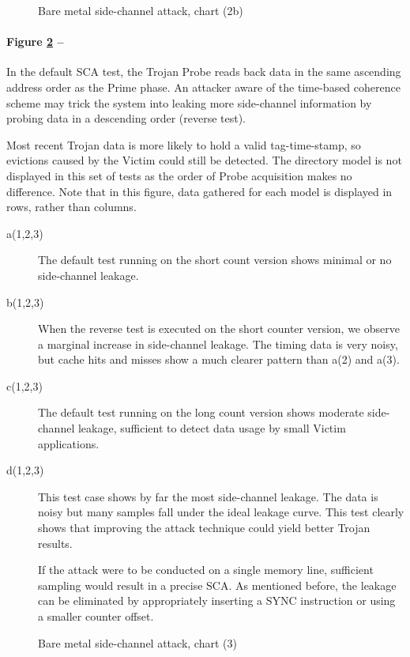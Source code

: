 					\begin{figure}[!h]
					\centering 
						\caption{Bare metal side-channel attack, chart (2b)} 
						\label{baremetal_core_pin_long_2x}
					\end{figure}


\clearpage
				\paragraph{Figure \ref{baremetal_core_pin_reverse} --}
					In the default SCA test, the Trojan Probe reads back data in the same ascending address order as the Prime phase. An attacker aware of the time-based coherence scheme may trick the system into leaking more side-channel information by probing data in a descending order (reverse test). 
					
					Most recent Trojan data is more likely to hold a valid tag-time-stamp, so evictions caused by the Victim could still be detected. The directory model is not displayed in this set of tests as the order of Probe acquisition makes no difference. Note that in this figure, data gathered for each model is displayed in rows, rather than columns. 
					\begin{description}
					\item [a(1,2,3)] 
						The default test running on the short count version shows minimal or no side-channel leakage. 
					\item [b(1,2,3)] 
						When the reverse test is executed on the short counter version, we observe a marginal increase in side-channel leakage. The timing data is very noisy, but cache hits and misses show a much clearer pattern than a(2) and a(3). 
					\item [c(1,2,3)] 
						The default test running on the long count version shows moderate side-channel leakage, sufficient to detect data usage by small Victim applications.
					\item [d(1,2,3)] 
						This test case shows by far the most side-channel leakage. The data is noisy but many samples fall under the ideal leakage curve. This test clearly shows that improving the attack technique could yield better Trojan results. 
						
						If the attack were to be conducted on a single memory line, sufficient sampling would result in a precise SCA. As mentioned before, the leakage can be eliminated by appropriately inserting a SYNC instruction or using a smaller counter offset. 
					\end{description}
					\begin{figure}[!h]
					\centering 
						\caption{Bare metal side-channel attack, chart (3)} 
						\label{baremetal_core_pin_reverse}
					\end{figure}

